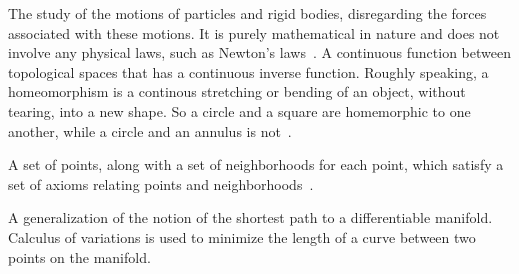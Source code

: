 
{
    The study of the motions of particles and rigid bodies, disregarding the forces associated with these motions.
    It is purely mathematical in nature and does not involve any physical laws, such as Newton's laws~\cite{greenwood1988}.
}
{
   A continuous function between topological spaces that has a continuous inverse function.
   Roughly speaking, a homeomorphism is a continous stretching or bending of an object, without tearing, into a new shape. 
   So a circle and a square are homemorphic to one another, while a circle and an annulus is not~\cite{morris1989}.
}

{
    A set of points, along with a set of neighborhoods for each point, which satisfy a set of axioms relating points and neighborhoods~\cite{morris1989}.
}

{
    A generalization of the notion of the shortest path to a differentiable manifold. 
    Calculus of variations is used to minimize the length of a curve between two points on the manifold.
}
